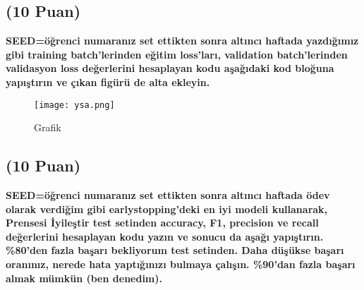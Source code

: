 \documentclass[11pt]{article}
\begin{document}
\subsection{(10 Puan)} \textbf{SEED=öğrenci numaranız set ettikten sonra altıncı haftada yazdığımız gibi training batch'lerinden eğitim loss'ları, validation batch'lerinden validasyon loss değerlerini hesaplayan kodu aşağıdaki kod bloğuna yapıştırın ve çıkan figürü de alta ekleyin.}



\begin{figure}[ht!]
    \centering
    \texttt{[image: ysa.png]}
    \caption{Grafik}
    \label{fig:my_pic}
\end{figure}


\doublespacing
 \subsection{(10 Puan)} \textbf{SEED=öğrenci numaranız set ettikten sonra altıncı haftada ödev olarak verdiğim gibi earlystopping'deki en iyi modeli kullanarak, Prensesi İyileştir test setinden accuracy, F1, precision ve recall değerlerini hesaplayan kodu yazın ve sonucu da aşağı yapıştırın. \%80'den fazla başarı bekliyorum test setinden. Daha düşükse başarı oranınız, nerede hata yaptığınızı bulmaya çalışın. \%90'dan fazla başarı almak mümkün (ben denedim).}
\end{document}
